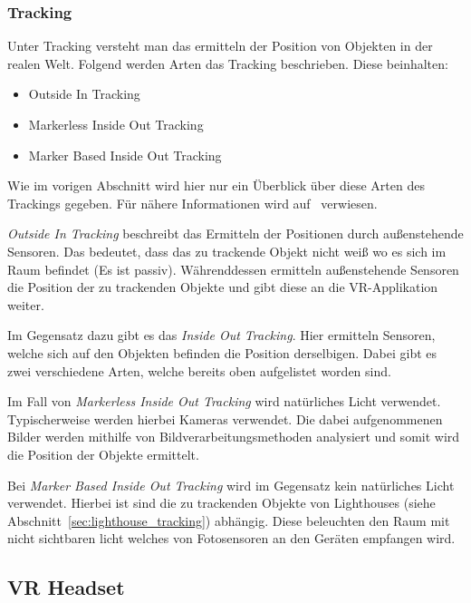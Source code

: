 \subsubsection{Tracking}
\label{sec:tracking}

Unter Tracking versteht man das ermitteln der Position von Objekten in der realen Welt.
Folgend werden Arten das Tracking beschrieben.
Diese beinhalten:

\begin{itemize}
    \item Outside In Tracking
    \item Markerless Inside Out Tracking
    \item Marker Based Inside Out Tracking
\end{itemize}

Wie im vorigen Abschnitt wird hier nur ein Überblick über diese Arten des Trackings gegeben.
Für nähere Informationen wird auf~\cite{Dennis_Ziesecke_2019} verwiesen.

\emph{Outside In Tracking} beschreibt das Ermitteln der Positionen durch außenstehende Sensoren.
Das bedeutet, dass das zu trackende Objekt nicht weiß wo es sich im Raum befindet (Es ist passiv).
Währenddessen ermitteln außenstehende Sensoren die Position der zu trackenden Objekte und gibt diese an die VR-Applikation weiter.

Im Gegensatz dazu gibt es das \emph{Inside Out Tracking}.
Hier ermitteln Sensoren, welche sich auf den Objekten befinden die Position derselbigen.
Dabei gibt es zwei verschiedene Arten, welche bereits oben aufgelistet worden sind.

Im Fall von \emph{Markerless Inside Out Tracking} wird natürliches Licht verwendet.
Typischerweise werden hierbei Kameras verwendet.
Die dabei aufgenommenen Bilder werden mithilfe von Bildverarbeitungsmethoden analysiert und somit wird die Position der Objekte ermittelt.

Bei \emph{Marker Based Inside Out Tracking} wird im Gegensatz kein natürliches Licht verwendet.
Hierbei ist sind die zu trackenden Objekte von Lighthouses (siehe Abschnitt~\ref{sec:lighthouse_tracking}) abhängig.
Diese beleuchten den Raum mit nicht sichtbaren licht welches von Fotosensoren an den Geräten empfangen wird.

\subsection{VR Headset}
\label{sec:vr-headset}

